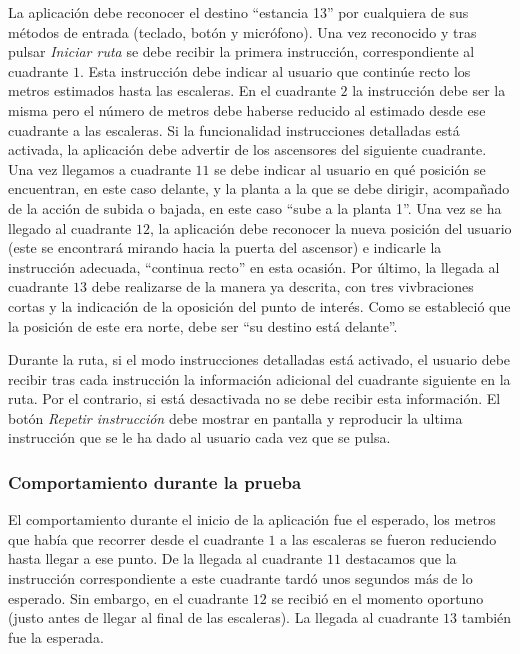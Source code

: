 La aplicación debe reconocer el destino ``estancia 13'' por cualquiera de sus métodos de entrada (teclado, botón y micrófono). Una vez reconocido y tras pulsar \textit{Iniciar ruta} se debe recibir la primera instrucción, correspondiente al cuadrante $1$. Esta instrucción debe indicar al usuario que continúe recto los metros estimados hasta las escaleras. En el cuadrante $2$ la instrucción debe ser la misma pero el número de metros debe haberse reducido al estimado desde ese cuadrante a las escaleras. Si la funcionalidad instrucciones detalladas está activada, la aplicación debe advertir de los ascensores del siguiente cuadrante. Una vez llegamos a cuadrante $11$ se debe indicar al usuario en qué posición se encuentran, en este caso delante, y la planta a la que se debe dirigir, acompañado de la acción de subida o bajada, en este caso ``sube a la planta 1''. Una vez se ha llegado al cuadrante $12$, la aplicación debe reconocer la nueva posición del usuario (este se encontrará mirando hacia la puerta del ascensor) e indicarle la instrucción adecuada, ``continua recto'' en esta ocasión. Por último, la llegada al cuadrante $13$ debe realizarse de la manera ya descrita, con tres vivbraciones cortas y la indicación de la oposición del punto de interés. Como se estableció que la posición de este era norte, debe ser ``su destino está delante''. 

Durante la ruta, si el modo instrucciones detalladas está activado, el usuario debe recibir tras cada instrucción la información adicional del cuadrante siguiente en la ruta. Por el contrario, si está desactivada no se debe recibir esta información. El botón \textit{Repetir instrucción} debe mostrar en pantalla y reproducir la ultima instrucción que se le ha dado al usuario cada vez que se pulsa. 


\subsubsection*{Comportamiento durante la prueba}

El comportamiento durante el inicio de la aplicación fue el esperado, los metros que había que recorrer desde el cuadrante $1$ a las escaleras se fueron reduciendo hasta llegar a ese punto. De la llegada al cuadrante $11$ destacamos que la instrucción correspondiente a este cuadrante tardó unos segundos más de lo esperado. Sin embargo, en el cuadrante $12$ se recibió en el momento oportuno (justo antes de llegar al final de las escaleras). La llegada al cuadrante $13$ también fue la esperada. 

